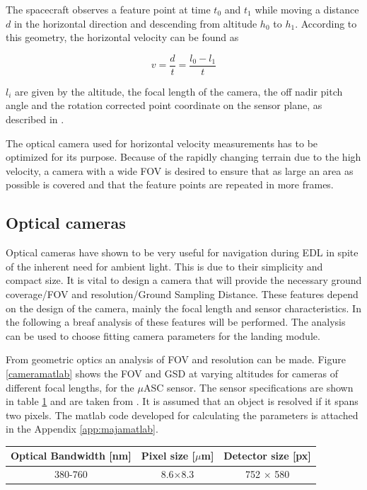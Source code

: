 The spacecraft observes a feature point at time $t_0$ and $t_1$ while moving a distance $d$ in the horizontal direction and descending from altitude $h_0$ to $h_1$. According to this geometry, the horizontal velocity can be found as

\begin{equation}
v=\dfrac{d}{t}=\dfrac{l_0-l_1}{t}
\end{equation}

$l_i$ are given by the altitude, the focal length of the camera, the off nadir pitch angle and the rotation corrected point coordinate on the sensor plane, as described in \cite{alessandro}.


The optical camera used for horizontal velocity measurements has to be optimized for its purpose. Because of the rapidly changing terrain due to the high velocity, a camera with a wide FOV is desired to ensure that as large an area as possible is covered and that the feature points are repeated in more frames.


 
\subsection{Optical cameras}

Optical cameras have shown to be very useful for navigation during EDL in spite of the inherent need for ambient light. This is due to their simplicity and compact size. It is vital to design a camera that will provide the necessary ground coverage/FOV and resolution/Ground Sampling Distance. These features depend on the design of the camera, mainly the focal length and sensor characteristics. In the following a breaf analysis of these features will be performed. The analysis can be used to choose fitting camera parameters for the landing module. 

From geometric optics an analysis of FOV and resolution can be made. Figure \ref{cameramatlab} shows the FOV  and GSD at varying altitudes for cameras of different focal lengths, for the $\mu$ASC sensor. The sensor specifications are shown in table \ref{tab:ASC} and are taken from \cite{alessandro}. It is assumed that an object is resolved if it spans two pixels. The matlab code developed for calculating the parameters is attached in the Appendix \ref{app:majamatlab}.

\begin{table}[htb]
\begin{center}
\begin{tabular}{|c|c|c|}
\hline
Optical Bandwidth [nm] & Pixel size [$\mu$m] & Detector size [px]\\
\hline
380-760  & 8.6$\times $8.3 & 752 $\times$ 580 \\
\hline
\end{tabular}
\label{tab:ASC}
\end{center}
\end{table}

